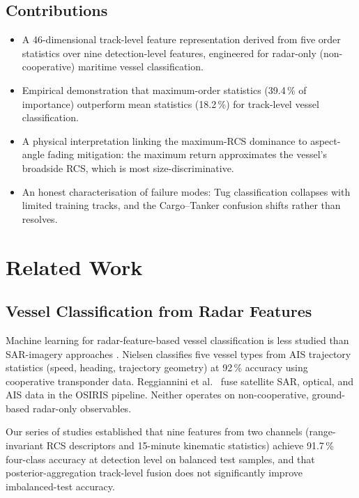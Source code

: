 \documentclass[10pt,journal,compsoc]{IEEEtran}
\begin{document}
\subsection{Contributions}
\begin{itemize}
\item A 46-dimensional track-level feature representation derived from
      five order statistics over nine detection-level features, engineered
      for radar-only (non-cooperative) maritime vessel classification.
\item Empirical demonstration that maximum-order statistics
      (39.4\,\% of importance) outperform mean statistics
      (18.2\,\%) for track-level vessel classification.
\item A physical interpretation linking the maximum-RCS dominance to
      aspect-angle fading mitigation: the maximum return approximates
      the vessel's broadside RCS, which is most size-discriminative.
\item An honest characterisation of failure modes: Tug classification
      collapses with limited training tracks, and the Cargo--Tanker
      confusion shifts rather than resolves.
\end{itemize}

\section{Related Work}\label{sec:related}

\subsection{Vessel Classification from Radar Features}

Machine learning for radar-feature-based vessel classification is less studied
than SAR-imagery approaches \cite{survey_sar_dl}.
Nielsen \cite{nielsen_2025} classifies five vessel types from AIS trajectory
statistics (speed, heading, trajectory geometry) at 92\,\% accuracy using
cooperative transponder data.  Reggiannini et al.\ \cite{osiris_2024} fuse
satellite SAR, optical, and AIS data in the OSIRIS pipeline.  Neither operates
on non-cooperative, ground-based radar-only observables.

Our series of studies \cite{paper6_kinrcs,paper7_arith} established that
nine features from two channels (range-invariant RCS descriptors and
15-minute kinematic statistics) achieve 91.7\,\% four-class accuracy at
detection level on balanced test samples, and that posterior-aggregation
track-level fusion does not significantly improve imbalanced-test accuracy.
\end{document}
